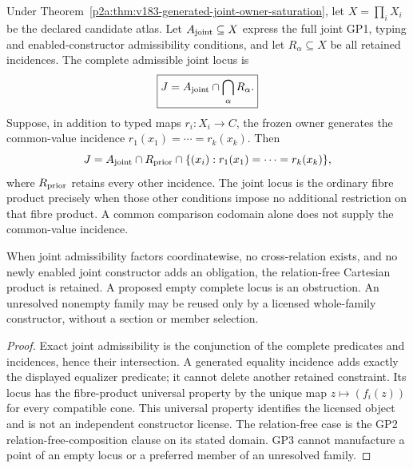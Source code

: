 \documentclass[12pt,a4paper]{article}
\begin{document}
\begin{corollary}
\label{p2a:cor:v183-joint-owner-fibre-product}
Under Theorem~\ref{p2a:thm:v183-generated-joint-owner-saturation}, let
$X=\prod_iX_i$ be the declared candidate atlas. Let $A_{\rm joint}\subseteq X$
express the full joint GP1, typing and enabled-constructor admissibility
conditions, and let $R_\alpha\subseteq X$ be all retained incidences. The
complete admissible joint locus is
\[
 \boxed{J=A_{\rm joint}\cap\bigcap_\alpha R_\alpha.}
\]
Suppose, in addition to typed maps $r_i:X_i\to C$, the frozen owner generates
the common-value incidence $r_1(x_1)=\cdots=r_k(x_k)$. Then
\[
 J=A_{\rm joint}\cap R_{\rm prior}\cap
       \{(x_i):r_1(x_1)=\cdots=r_k(x_k)\},
\]
where $R_{\rm prior}$ retains every other incidence. The joint locus is the
ordinary fibre product precisely when those other conditions impose no
additional restriction on that fibre product. A common comparison codomain
alone does not supply the common-value incidence.

When joint admissibility factors coordinatewise, no cross-relation exists,
and no newly enabled joint constructor adds an obligation, the relation-free
Cartesian product is retained. A proposed empty complete locus is an
obstruction. An unresolved nonempty family may be reused only by a licensed
whole-family constructor, without a section or member selection.
\end{corollary}
\begin{proof}
Exact joint admissibility is the conjunction of the complete predicates and
incidences, hence their intersection. A generated equality incidence adds
exactly the displayed equalizer predicate; it cannot delete another retained
constraint. Its locus has the fibre-product universal property by the unique
map $z\mapsto(f_i(z))$ for every compatible cone. This universal property
identifies the licensed object and is not an independent constructor license.
The relation-free case is the GP2 relation-free-composition clause on its
stated domain. GP3 cannot manufacture a point of an empty locus or a preferred
member of an unresolved family.
\end{proof}
\end{document}
